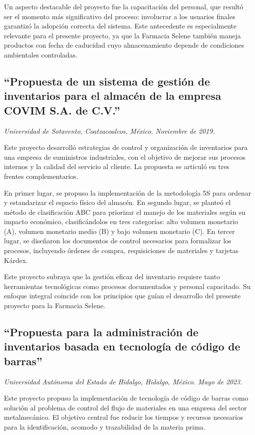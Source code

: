 Un aspecto destacable del proyecto fue la capacitación del personal, que resultó ser el momento más significativo del proceso: involucrar a los usuarios finales garantizó la adopción correcta del sistema. Este antecedente es especialmente relevante para el presente proyecto, ya que la Farmacia Selene también maneja productos con fecha de caducidad cuyo almacenamiento depende de condiciones ambientales controladas.


\subsection{``Propuesta de un sistema de gestión de inventarios para el almacén de la empresa COVIM S.A. de C.V.''}
\textit{Universidad de Sotavento, Coatzacoalcos, México. Noviembre de 2019.}

Este proyecto desarrolló estrategias de control y organización de inventarios para una empresa de suministros industriales, con el objetivo de mejorar sus procesos internos y la calidad del servicio al cliente. La propuesta se articuló en tres frentes complementarios.

En primer lugar, se propuso la implementación de la metodología 5S para ordenar y estandarizar el espacio físico del almacén. En segundo lugar, se planteó el método de clasificación ABC para priorizar el manejo de los materiales según su impacto económico, clasificándolos en tres categorías: alto volumen monetario (A), volumen monetario medio (B) y bajo volumen monetario (C). En tercer lugar, se diseñaron los documentos de control necesarios para formalizar los procesos, incluyendo órdenes de compra, requisiciones de materiales y tarjetas Kárdex.

Este proyecto subraya que la gestión eficaz del inventario requiere tanto herramientas tecnológicas como procesos documentados y personal capacitado. Su enfoque integral coincide con los principios que guían el desarrollo del presente proyecto para la Farmacia Selene.


\subsection{``Propuesta para la administración de inventarios basada en tecnología de código de barras''}
\textit{Universidad Autónoma del Estado de Hidalgo, Hidalgo, México. Mayo de 2023.}

Este proyecto propuso la implementación de tecnología de código de barras como solución al problema de control del flujo de materiales en una empresa del sector metalmecánico. El objetivo central fue reducir los tiempos y recursos necesarios para la identificación, acomodo y trazabilidad de la materia prima.

